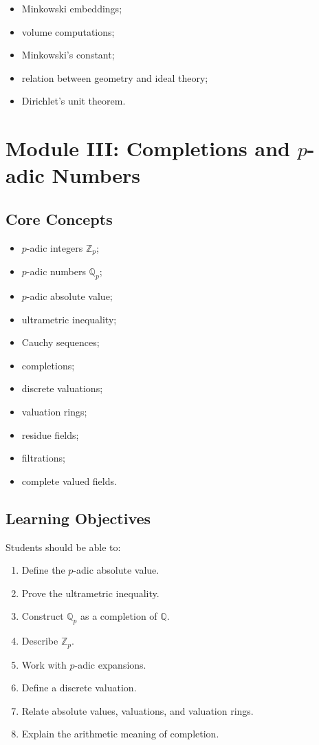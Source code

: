 \documentclass[11pt,a4paper]{article}
\newcommand{\Z}{\mathbb Z}
\newcommand{\Q}{\mathbb Q}
\begin{document}
\begin{itemize}
    \item Minkowski embeddings;
    \item volume computations;
    \item Minkowski's constant;
    \item relation between geometry and ideal theory;
    \item Dirichlet's unit theorem.
\end{itemize}

\section{Module III: Completions and \(p\)-adic Numbers}

\subsection{Core Concepts}

\begin{itemize}
    \item \(p\)-adic integers \(\Z_p\);
    \item \(p\)-adic numbers \(\Q_p\);
    \item \(p\)-adic absolute value;
    \item ultrametric inequality;
    \item Cauchy sequences;
    \item completions;
    \item discrete valuations;
    \item valuation rings;
    \item residue fields;
    \item filtrations;
    \item complete valued fields.
\end{itemize}

\subsection{Learning Objectives}

Students should be able to:

\begin{enumerate}
    \item Define the \(p\)-adic absolute value.
    \item Prove the ultrametric inequality.
    \item Construct \(\Q_p\) as a completion of \(\Q\).
    \item Describe \(\Z_p\).
    \item Work with \(p\)-adic expansions.
    \item Define a discrete valuation.
    \item Relate absolute values, valuations, and valuation rings.
    \item Explain the arithmetic meaning of completion.
\end{enumerate}
\end{document}
